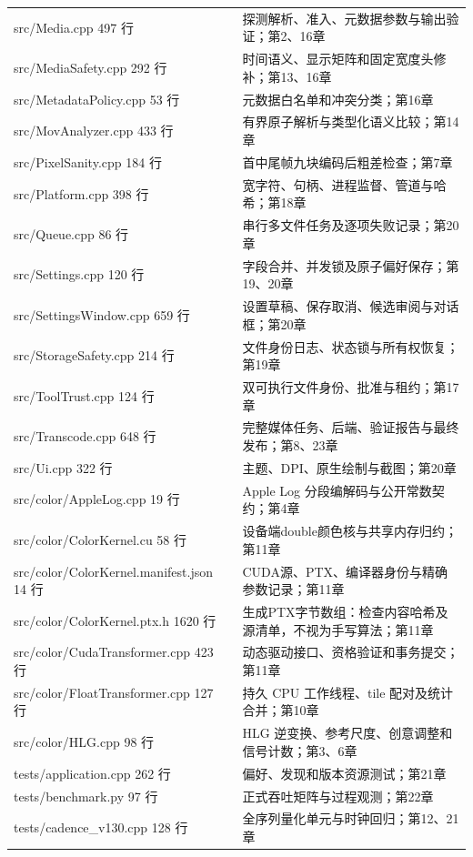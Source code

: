 \documentclass[UTF8,zihao=-4,openany]{ctexbook}
\begin{document}
\begin{longtable}{p{.43\linewidth}p{.47\linewidth}}
src/Media.cpp
497 行 & 探测解析、准入、元数据参数与输出验证；第2、16章\\
src/MediaSafety.cpp
292 行 & 时间语义、显示矩阵和固定宽度头修补；第13、16章\\
src/MetadataPolicy.cpp
53 行 & 元数据白名单和冲突分类；第16章\\
src/MovAnalyzer.cpp
433 行 & 有界原子解析与类型化语义比较；第14章\\
src/PixelSanity.cpp
184 行 & 首中尾帧九块编码后粗差检查；第7章\\
src/Platform.cpp
398 行 & 宽字符、句柄、进程监督、管道与哈希；第18章\\
src/Queue.cpp
86 行 & 串行多文件任务及逐项失败记录；第20章\\
src/Settings.cpp
120 行 & 字段合并、并发锁及原子偏好保存；第19、20章\\
src/SettingsWindow.cpp
659 行 & 设置草稿、保存取消、候选审阅与对话框；第20章\\
src/StorageSafety.cpp
214 行 & 文件身份日志、状态锁与所有权恢复；第19章\\
src/ToolTrust.cpp
124 行 & 双可执行文件身份、批准与租约；第17章\\
src/Transcode.cpp
648 行 & 完整媒体任务、后端、验证报告与最终发布；第8、23章\\
src/Ui.cpp
322 行 & 主题、DPI、原生绘制与截图；第20章\\
src/color/AppleLog.cpp
19 行 & Apple Log 分段编解码与公开常数契约；第4章\\
src/color/ColorKernel.cu
58 行 & 设备端double颜色核与共享内存归约；第11章\\
src/color/ColorKernel.manifest.json
14 行 & CUDA源、PTX、编译器身份与精确参数记录；第11章\\
src/color/ColorKernel.ptx.h
1620 行 & 生成PTX字节数组：检查内容哈希及源清单，不视为手写算法；第11章\\
src/color/CudaTransformer.cpp
423 行 & 动态驱动接口、资格验证和事务提交；第11章\\
src/color/FloatTransformer.cpp
127 行 & 持久 CPU 工作线程、tile 配对及统计合并；第10章\\
src/color/HLG.cpp
98 行 & HLG 逆变换、参考尺度、创意调整和信号计数；第3、6章\\
tests/application.cpp
262 行 & 偏好、发现和版本资源测试；第21章\\
tests/benchmark.py
97 行 & 正式吞吐矩阵与过程观测；第22章\\
tests/cadence\_v130.cpp
128 行 & 全序列量化单元与时钟回归；第12、21章\\

\end{longtable}
\end{document}
